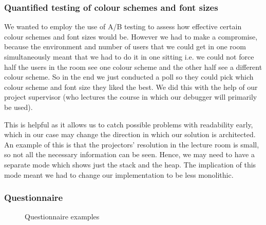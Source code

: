 \documentclass[11pt, a4paper]{article}
\begin{document}
\subsubsection{Quantified testing of colour schemes and font sizes}
We wanted to employ the use of A/B testing to assess how effective certain colour schemes and font sizes would be.
However we had to make a compromise, because the environment and number of users that we could get in one room simultaneously meant that we had to do it in one sitting i.e. we could not force half the users in the room see one colour scheme and the other half see a different colour scheme.
So in the end we just conducted a poll so they could pick which colour scheme and font size they liked the best.
We did this with the help of our project supervisor (who lectures the course in which our debugger will primarily be used).

This is helpful as it allows us to catch possible problems with readability early, which in our case may change the direction in which our solution is architected.
An example of this is that the projectors’ resolution in the lecture room is small, so not all the necessary information can be seen.
Hence, we may need to have a separate mode which shows just the stack and the heap.
The implication of this mode meant we had to change our implementation to be less monolithic.

\subsubsection{Questionnaire}
\begin{figure}[h!]
\centering
{}
\quad
{}
\caption{Questionnaire examples}
\end{figure}
\end{document}
